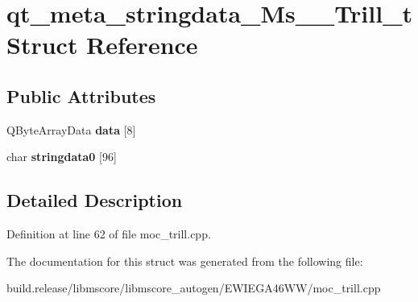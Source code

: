 \hypertarget{structqt__meta__stringdata___ms_____trill__t}{}\section{qt\+\_\+meta\+\_\+stringdata\+\_\+\+Ms\+\_\+\+\_\+\+Trill\+\_\+t Struct Reference}
\label{structqt__meta__stringdata___ms_____trill__t}
\subsection*{Public Attributes}
\begin{DoxyCompactItemize}
\item 
\mbox{\label{structqt__meta__stringdata___ms_____trill__t_a001a875320e391f2221620b8dd86ad59}} 
Q\+Byte\+Array\+Data {\bfseries data} \mbox{[}8\mbox{]}
\item 
\mbox{\label{structqt__meta__stringdata___ms_____trill__t_a8ef6509b2821a7c0f4a922b44fde57a2}} 
char {\bfseries stringdata0} \mbox{[}96\mbox{]}
\end{DoxyCompactItemize}


\subsection{Detailed Description}


Definition at line 62 of file moc\+\_\+trill.\+cpp.



The documentation for this struct was generated from the following file\+:\begin{DoxyCompactItemize}
\item 
build.\+release/libmscore/libmscore\+\_\+autogen/\+E\+W\+I\+E\+G\+A46\+W\+W/moc\+\_\+trill.\+cpp\end{DoxyCompactItemize}
